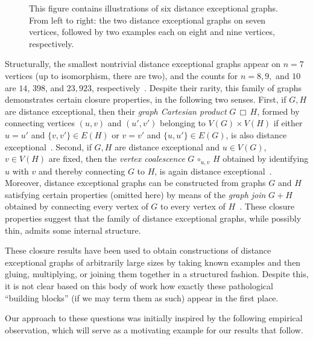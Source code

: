 \documentclass[11pt,a4paper]{article}
\newcommand{\Circ}{\circ}
\begin{document}
\begin{figure}[t!]
        \caption{This figure contains illustrations of six distance exceptional graphs. From left to right: the two distance exceptional graphs on seven vertices, followed by two examples each on eight and nine vertices, respectively.}\label{fig:small-dx-examples}
    \end{figure}

    Structurally, the smallest nontrivial distance exceptional graphs appear on $n=7$ vertices (up to isomorphism, there are two), and the counts for $n=8,9,$ and $10$ are $14$, $398$, and $23,923$, respectively~\cite{OEISA354465}. Despite their rarity, this family of graphs demonstrates certain closure properties, in the following two senses. First, if $G, H$ are distance exceptional, then their \emph{graph Cartesian product} $G\,\Box\, H$, formed by connecting vertices $(u, v)$ and $(u', v')$ belonging to $V(G)\times V(H)$ if either $u=u'$ and $\{v, v'\}\in E(H)$ or $v=v'$ and $\{u, u'\}\in E(G)$, is also distance exceptional~\cite[Thm. 6]{dudarov2023image}. Second, if $G, H$ are distance exceptional and $u\in V(G)$, $v\in V(H)$ are fixed, then the \emph{vertex coalescence} $G\,\Circ_{u,v}\,H$ obtained by identifying $u$ with $v$ and thereby connecting $G$ to $H$, is again distance exceptional~\cite[Thm. 6]{chen2023steinerberger}. Moreover, distance exceptional graphs can be constructed from graphs $G$ and $H$ satisfying certain properties (omitted here) by means of the \emph{graph join} $G+ H$ obtained by connecting every vertex of $G$ to every vertex of $H$~\cite[Thm. 4]{dudarov2023image}. These closure properties suggest that the family of distance exceptional graphs, while possibly thin, admits some internal structure.

    These closure results have been used to obtain constructions of distance exceptional graphs of arbitrarily large sizes by taking known examples and then gluing, multiplying, or joining them together in a structured fashion. Despite this, it is not clear based on this body of work how exactly these pathological ``building blocks'' (if we may term them as such) appear in the first place. 

    Our approach to these questions was initially inspired by the following empirical observation, which will serve as a motivating example for our results that follow.
    
\end{document}
